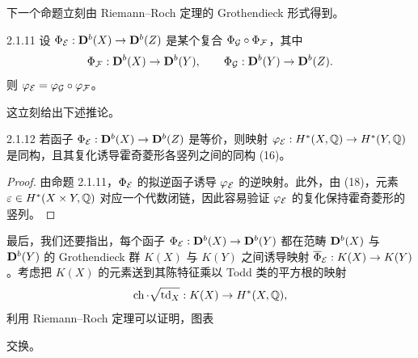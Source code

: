 下一个命题立刻由 Riemann--Roch 定理的 Grothendieck 形式得到。

\begin{proposition}{2.1.11}
设 $\Phi_{\mathcal{E}}:\mathbf{D}^{b}(X)\to\mathbf{D}^{b}(Z)$ 是某个复合 $\Phi_{\mathcal{G}}\circ\Phi_{\mathcal{F}}$，其中
\begin{equation*}
\Phi_{\mathcal{F}}:\mathbf{D}^{b}(X)\to\mathbf{D}^{b}(Y),
\qquad
\Phi_{\mathcal{G}}:\mathbf{D}^{b}(Y)\to\mathbf{D}^{b}(Z).
\end{equation*}
则 $\varphi_{\mathcal{E}}=\varphi_{\mathcal{G}}\circ\varphi_{\mathcal{F}}$。
\end{proposition}

这立刻给出下述推论。

\begin{corollary}{2.1.12}
若函子 $\Phi_{\mathcal{E}}:\mathbf{D}^{b}(X)\to\mathbf{D}^{b}(Z)$ 是等价，则映射 $\varphi_{\mathcal{E}}:H^{*}(X,\mathbb{Q})\to H^{*}(Y,\mathbb{Q})$ 是同构，且其复化诱导霍奇菱形各竖列之间的同构 (16)。
\end{corollary}


\begin{proof}
由命题 2.1.11，$\Phi_{\mathcal{E}}$ 的拟逆函子诱导 $\varphi_{\mathcal{E}}$ 的逆映射。此外，由 (18)，元素 $\varepsilon\in H^{*}(X\times Y,\mathbb{Q})$ 对应一个代数闭链，因此容易验证 $\varphi_{\mathcal{E}}$ 的复化保持霍奇菱形的竖列。
\end{proof}

最后，我们还要指出，每个函子 $\Phi_{\mathcal{E}}:\mathbf{D}^{b}(X)\to\mathbf{D}^{b}(Y)$ 都在范畴 $\mathbf{D}^{b}(X)$ 与 $\mathbf{D}^{b}(Y)$ 的 Grothendieck 群 $K(X)$ 与 $K(Y)$ 之间诱导映射 $\overline{\Phi}_{\mathcal{E}}:K(X)\to K(Y)$。考虑把 $K(X)$ 的元素送到其陈特征乘以 Todd 类的平方根的映射
\begin{equation*}
\operatorname{ch}\cdot\sqrt{\operatorname{td}_X}:K(X)\to H^{*}(X,\mathbb{Q}),
\end{equation*}
利用 Riemann--Roch 定理可以证明，图表
\begin{center}
\end{center}
交换。

